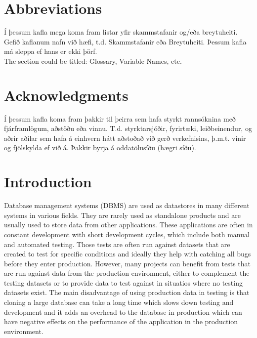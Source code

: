 \documentclass[a4paper,12pt,twoside,BCOR=10mm]{scrbook}
\begin{document}
\tableofcontents
\listoffigures
\listoftables

\chapter*{Abbreviations}
Í þessum kafla mega koma fram listar yfir skammstafanir og/eða breytuheiti. Gefið kaflanum nafn við hæfi, t.d. Skammstafanir eða Breytuheiti. Þessum kafla má sleppa ef hans er ekki þörf. \\

The section could be titled: Glossary, Variable Names, etc.

\chapter*{Acknowledgments}
Í þessum kafla koma fram þakkir til þeirra sem hafa styrkt rannsóknina með fjárframlögum, aðstöðu eða vinnu. T.d. styrktarsjóðir, fyrirtæki, leiðbeinendur, og aðrir aðilar sem hafa á einhvern hátt aðstoðað við gerð verkefnisins, þ.m.t. vinir og fjölskylda ef við á. Þakkir byrja á oddatölusíðu (hægri síðu).


\chapter{Introduction}
\setcounter{page}{1}
Database management systems (DBMS) are used as datastores in many different systems in various fields. They are rarely used as standalone products and are usually used to store data from other applications. These applications are often in constant development with short development cycles, which include both manual and automated testing. Those  tests are often run against datasets that are created to test for specific conditions and ideally they help with catching all bugs before they enter production. However, many projects can benefit from tests that are run against data from the production environment, either to complement the testing datasets or to provide data to test against in situatios where no testing datasets exist. The main disadvantage of using production data in testing is that cloning a large database can take a long time which slows down testing and development and it adds an overhead to the database in production which can have negative effects on the performance of the application in the production environment.
\end{document}

